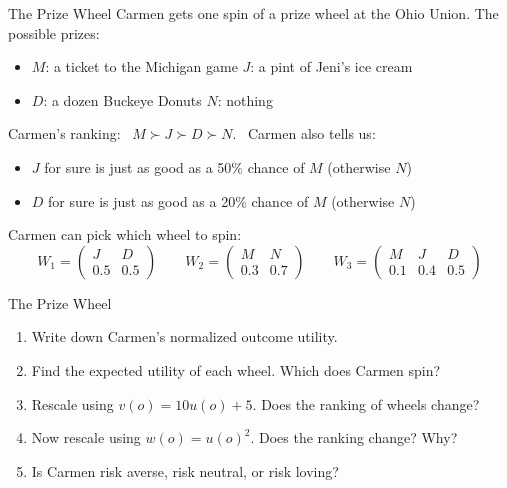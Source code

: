\begin{frame}{The Prize Wheel}
Carmen gets one spin of a prize wheel at the Ohio Union. The possible prizes:
\begin{itemize}
    \item $M$: a ticket to the Michigan game \hspace{0.4in} $J$: a pint of Jeni's ice cream
    \item $D$: a dozen Buckeye Donuts \hspace{0.72in} $N$: nothing
\end{itemize}
Carmen's ranking: \ $M\succ J\succ D\succ N$. \ Carmen also tells us:
\begin{itemize}
    \item $J$ for sure is just as good as a 50\% chance of $M$ (otherwise $N$)
    \item $D$ for sure is just as good as a 20\% chance of $M$ (otherwise $N$)
\end{itemize}
\bsk
Carmen can pick which wheel to spin:
$$W_1=\begin{pmatrix} J & D \\[2pt] 0.5 & 0.5\end{pmatrix}
\qquad
W_2=\begin{pmatrix} M & N \\[2pt] 0.3 & 0.7\end{pmatrix}
\qquad
W_3=\begin{pmatrix} M & J & D \\[2pt] 0.1 & 0.4 & 0.5\end{pmatrix}$$
\vspace{-0.2in}
\end{frame}

\begin{frame}{The Prize Wheel}
\begin{enumerate}
    \item Write down Carmen's normalized outcome utility. \vspace{0.3in}
    \item Find the expected utility of each wheel. Which does Carmen spin? \vspace{0.45in}
    \item Rescale using $v(o)=10u(o)+5$. Does the ranking of wheels change? \vspace{0.35in}
    \item Now rescale using $w(o)=u(o)^2$. Does the ranking change? Why? \vspace{0.35in}
    \item Is Carmen risk averse, risk neutral, or risk loving? \vspace{0.2in}
\end{enumerate}
\end{frame}

